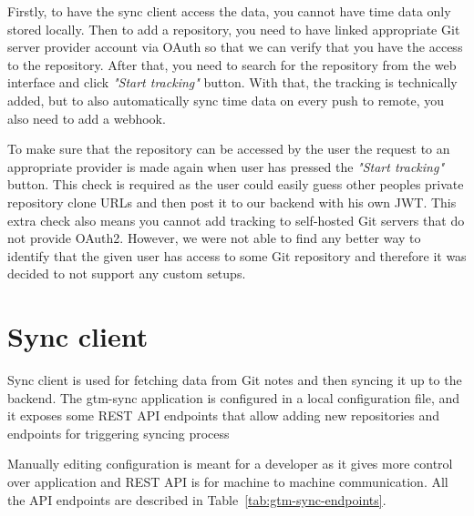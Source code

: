 Firstly, to have the sync client access the data, you cannot have time data only stored locally. %
Then to add a repository, you need to have linked appropriate Git server provider account via OAuth so that we can
verify that you have the access to the repository.
After that, you need to search for the repository from the web interface and click \textit{"Start tracking"} button.
With that, the tracking is technically added, but to also automatically sync time data on every push to remote,
you also need to add a webhook.

To make sure that the repository can be accessed by the user the request to an appropriate provider is made again
when user has pressed the \textit{"Start tracking"} button.
This check is required as the user could easily guess other peoples private repository clone URLs and then post
it to our backend with his own JWT.
This extra check also means you cannot add tracking to self-hosted Git servers that do not provide OAuth2.
However, we were not able to find any better way to identify that the given user has access to some Git repository and
therefore it was decided to not support any custom setups.

\section{Sync client}\label{sec:sync-client-content}
Sync client is used for fetching data from Git notes and then syncing it up to the backend.
The gtm-sync application is configured in a local configuration file, and it exposes some REST API endpoints
that allow adding new repositories and endpoints for triggering syncing process

Manually editing configuration is meant for a developer as it gives more control over application and REST API is
for machine to machine communication.
All the API endpoints are described in Table~\ref{tab:gtm-sync-endpoints}.

